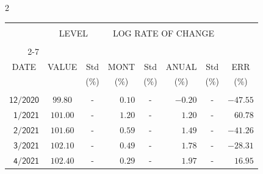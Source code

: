 \begin{multicols}{2}{ 
\begin{tabular}{rccrcrcr} 
\hline 
 \multicolumn{1}{|c|}{}  &  \multicolumn{2}{c|}{} & 
\multicolumn{4}{c}{} & \multicolumn{1}{|c|}{}\vspace{-.10in}\\ 
\multicolumn{1}{|c|}{}  &  \multicolumn{2}{c|}{LEVEL} & 
\multicolumn{4}{c}{LOG RATE OF CHANGE} & \multicolumn{1}{|c|}{}    \\  
\multicolumn{1}{|c|}{}  &  \multicolumn{2}{c|}{} & 
\multicolumn{4}{c}{} & \multicolumn{1}{|c|}{}\vspace{-.10in}\\ \cline{2-7} 
\multicolumn{1}{|c|}{ } &\multicolumn{1}{c|}{ } & \multicolumn{1}{c|}{} & \multicolumn{1}{c|}{} & \multicolumn{1}{c|}{}     & \multicolumn{1}{c|}{} & \multicolumn{1}{c|}{}  & \multicolumn{1}{c|}{}  \vspace{-.05in}\\  
\multicolumn{1}{|c|}{DATE } &\multicolumn{1}{c|}{ VALUE} & \multicolumn{1}{c|}{Std} & \multicolumn{1}{c|}{MONT} & \multicolumn{1}{c|}{Std}     & \multicolumn{1}{c|}{ANUAL} & \multicolumn{1}{c|}{Std}  & \multicolumn{1}{c|}{ERR}\\  
\multicolumn{1}{|c|}{ }      & \multicolumn{1}{c|}{  }    & \multicolumn{1}{c|}{($\%$)}&  \multicolumn{1}{c|}{($\%$)  }  & \multicolumn{1}{c|}{($\%$)} & \multicolumn{1}{c|}{($\%$) }     & \multicolumn{1}{c|}{ ($\%$) }  &  \multicolumn{1}{c|}{ ($\%$) } \\  
 \hline 
 \\$\mathsf{      12/2020}$ &$\mathsf{    99.80}$ &     - &$\mathsf{    0.10}$ &     - &$\mathsf{    -0.20 }$ &     - &$\mathsf{ -47.55} $ \vspace{-.005in}\\ 
$\mathsf{       1/2021}$ &$\mathsf{   101.00}$ &     - &$\mathsf{    1.20}$ &     - &$\mathsf{     1.20 }$ &     - &$\mathsf{  60.78} $ \vspace{-.005in}\\ 
$\mathsf{       2/2021}$ &$\mathsf{   101.60}$ &     - &$\mathsf{    0.59}$ &     - &$\mathsf{     1.49 }$ &     - &$\mathsf{ -41.26} $ \vspace{-.005in}\\ 
$\mathsf{       3/2021}$ &$\mathsf{   102.10}$ &     - &$\mathsf{    0.49}$ &     - &$\mathsf{     1.78 }$ &     - &$\mathsf{ -28.31} $ \vspace{-.005in}\\ 
$\mathsf{       4/2021}$ &$\mathsf{   102.40}$ &     - &$\mathsf{    0.29}$ &     - &$\mathsf{     1.97 }$ &     - &$\mathsf{  16.95} $ \vspace{-.005in}\\ 

\end{tabular}}
\end{multicols}
